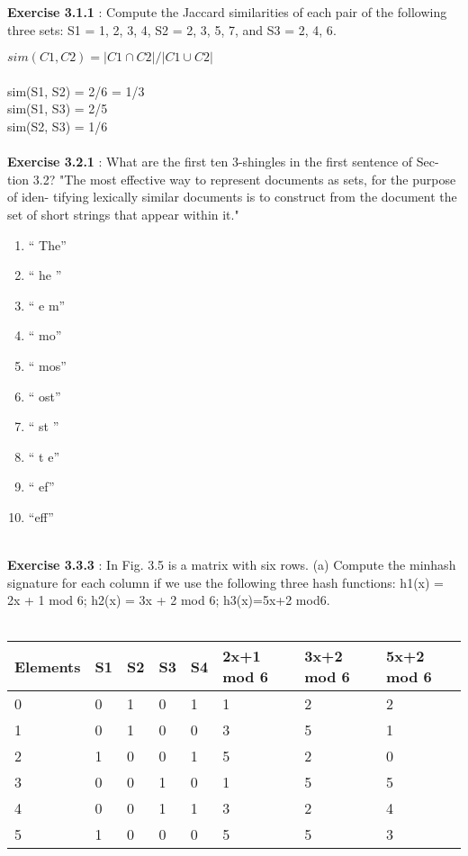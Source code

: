 \documentclass{exam}
\begin{document}
\begin{questions}
\question \textbf{Exercise 3.1.1} : Compute the Jaccard similarities of each pair of the following three sets: S1 = {1, 2, 3, 4}, S2 =  {2, 3, 5, 7}, and S3 = {2, 4, 6}.

$sim(C1, C2) = |C1 \cap C2|/|C1 \cup C2|$ \\\\
sim(S1, S2) = 2/6 = 1/3\\
sim(S1, S3) = 2/5\\
sim(S2, S3) =  1/6\\\\

\question \textbf{Exercise 3.2.1} : What are the first ten 3-shingles in the first sentence of Sec- tion 3.2?
"The most effective way to represent documents as sets, for the purpose of iden- tifying lexically similar documents is to construct from the document the set of short strings that appear within it."
\begin{enumerate}
\item `` The''
\item `` he ''
\item `` e m''
\item ``  mo''
\item `` mos''
\item `` ost''
\item `` st ''
\item `` t e''
\item `` ef''
\item ``eff'' \\\\
\end{enumerate}

\question \textbf{Exercise 3.3.3} : In Fig. 3.5 is a matrix with six rows.
(a) Compute the minhash signature for each column if we use the following three hash functions: h1(x) = 2x + 1 mod 6; h2(x) = 3x + 2 mod 6; h3(x)=5x+2 mod6.\\\\

\begin{center}
    \begin{tabular}{| l | l | l | l | l | l | l | l |}
    \hline
    Elements & S1 & S2 & S3 & S4 & 2x+1 mod 6 & 3x+2 mod 6 & 5x+2 mod 6 \\ \hline
     0 & 0 & 1 & 0 & 1 & 1 & 2 & 2\\ \hline
     1 & 0 & 1 & 0 & 0 & 3 & 5 & 1\\ \hline
     2 & 1 & 0 & 0 & 1 & 5 & 2 & 0\\ \hline
     3 & 0 & 0 & 1 & 0 & 1 & 5 & 5\\ \hline
     4 & 0 & 0 & 1 & 1 & 3 & 2 & 4\\ \hline
   	 5 & 1 & 0 & 0 & 0 & 5 & 5 & 3\\ \hline
    \end{tabular}
\end{center}


\end{questions}
\end{document}
